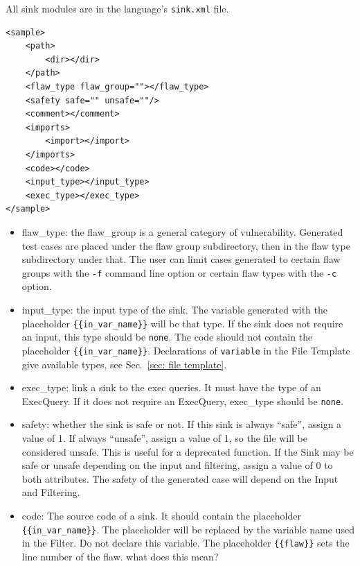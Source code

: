 \documentclass[12pt]{article}
\begin{document}
All sink modules are in the language's \verb|sink.xml| file.

\begin{verbatim}
<sample>
    <path>
	    <dir></dir>
    </path>
    <flaw_type flaw_group=""></flaw_type>
    <safety safe="" unsafe=""/>
    <comment></comment>
    <imports>
        <import></import>
    </imports>
    <code></code>
    <input_type></input_type>
    <exec_type></exec_type>
</sample>
\end{verbatim}

\begin{itemize}
    \item flaw\_type: the flaw\_group is a general category of vulnerability.
    Generated test cases are placed under the flaw group subdirectory, then
    in the flaw type subdirectory under that. The user can limit
    cases generated to certain flaw groups with the \verb|-f| command
    line option or certain flaw types with the \verb|-c| option.
    
    \item input\_type: the input type of the sink. The variable
    generated with the placeholder \verb|{{in_var_name}}| will be 
    that type.  If the sink does not
    require an input, this type should be \verb|none|. The code 
    should not contain
    the placeholder \verb|{{in_var_name}}|.
    Declarations of \verb|variable| in the File Template give
    available types, see Sec.~\ref{sec: file template}.

    \item exec\_type: link a sink to the exec queries.  It must have 
    the type of
    an ExecQuery. If it does not require an ExecQuery, 
    exec\_type should be \verb|none|.

    \item safety: whether the sink is safe or not. If this sink is always
    ``safe'', assign a value of 1.  If always ``unsafe'', assign a value 
    of 1, so the file will be considered unsafe.  
    This is useful for a deprecated function.  If the Sink may be safe or 
    unsafe depending on the input and filtering, assign a value of 0 to 
    both attributes.  The safety of the generated case will depend on
    the Input and Filtering.
    
    \item code: The source code of a sink. It should contain the placeholder
    \verb|{{in_var_name}}|.  The placeholder will be replaced by the variable
    name used in the Filter.  Do not declare this variable.  The placeholder
    \verb|{{flaw}}| sets the line number of the flaw. {\Large what does this mean?}
\end{itemize}
\end{document}
